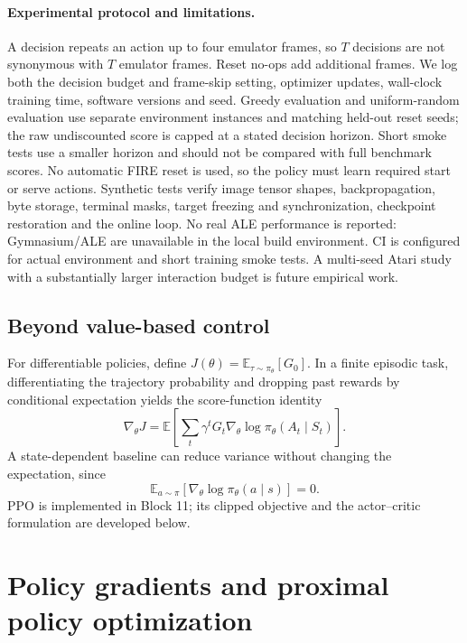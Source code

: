 \documentclass[11pt,a4paper]{article}
\newcommand{\E}{\mathbb E}
\begin{document}
\paragraph{Experimental protocol and limitations.}
A decision repeats an action up to four emulator frames, so $T$ decisions are
not synonymous with $T$ emulator frames. Reset no-ops add additional frames.
We log both the decision budget and frame-skip setting, optimizer updates,
wall-clock training time, software versions and seed. Greedy evaluation and
uniform-random evaluation use separate environment instances and matching held-out
reset seeds; the raw undiscounted score is capped at a stated decision horizon.
Short smoke tests use a smaller horizon and should not be compared with full
benchmark scores. No automatic FIRE reset is used, so the policy must learn
required start or serve actions. Synthetic tests verify image tensor shapes,
backpropagation, byte storage, terminal masks, target freezing and synchronization,
checkpoint restoration and the online loop. No real ALE performance is reported:
Gymnasium/ALE are unavailable in the local build environment. CI is configured
for actual environment and short training smoke tests. A multi-seed Atari study
with a substantially larger interaction budget is future empirical work.

\subsection{Beyond value-based control}
For differentiable policies, define $J(\theta)=\E_{\tau\sim\pi_\theta}[G_0]$. In a finite episodic task, differentiating the trajectory probability and dropping past rewards by conditional expectation yields the score-function identity
\[
 \nabla_\theta J=\E\left[\sum_t\gamma^t G_t\nabla_\theta\log\pi_\theta(A_t\mid S_t)\right].
\]
A state-dependent baseline can reduce variance without changing the expectation, since
\[\E_{a\sim\pi}[\nabla_\theta\log\pi_\theta(a\mid s)]=0.\]
PPO \cite{ppo} is implemented in Block 11; its clipped objective and the actor--critic formulation are developed below.


\section{Policy gradients and proximal policy optimization}
\end{document}
